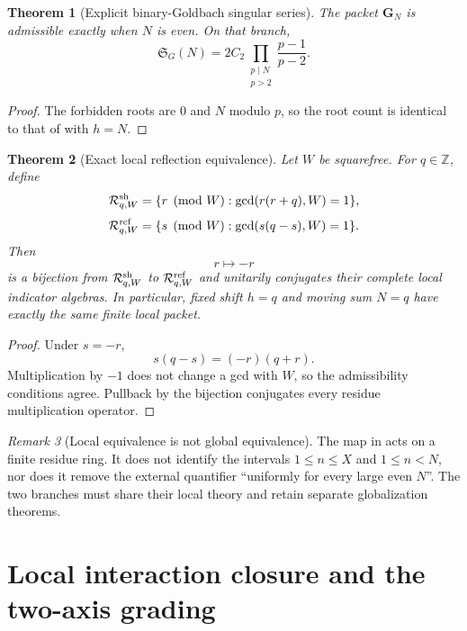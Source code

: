 \documentclass[11pt]{article}
\newtheorem{theorem}{Theorem}[section]
\theoremstyle{definition}
\theoremstyle{remark}
\newtheorem{remark}[theorem]{Remark}
\newcommand{\Z}{\mathbb Z}
\begin{document}
\begin{theorem}[Explicit binary-Goldbach singular series]
\label{thm:goldbach-series}
The packet $\bm G_N$ is admissible exactly when $N$ is even.  On that branch,
\[
 \boxed{
 \mathfrak S_G(N)
 =2C_2\prod_{\substack{p\mid N\\p>2}}
       \frac{p-1}{p-2}.}
 \tag{4.6}
\]
\end{theorem}

\begin{proof}
The forbidden roots are $0$ and $N$ modulo $p$, so the root count is identical
to that of  with $h=N$.
\end{proof}

\begin{theorem}[Exact local reflection equivalence]
\label{thm:local-reflection}
Let $W$ be squarefree.  For $q\in\Z$, define
\[
 \mathcal R_{q,W}^{\rm sh}
 =\{r\pmod W:\gcd(r(r+q),W)=1\},
\]
\[
 \mathcal R_{q,W}^{\rm ref}
 =\{s\pmod W:\gcd(s(q-s),W)=1\}.
\]
Then
\[
 \boxed{r\longmapsto-r}
 \tag{4.7}
\]
is a bijection from $\mathcal R_{q,W}^{\rm sh}$ to
$\mathcal R_{q,W}^{\rm ref}$ and unitarily conjugates their complete local
indicator algebras.  In particular, fixed shift $h=q$ and moving sum $N=q$
have exactly the same finite local packet.
\end{theorem}

\begin{proof}
Under $s=-r$,
\[
 s(q-s)=(-r)(q+r).
\]
Multiplication by $-1$ does not change a gcd with $W$, so the admissibility
conditions agree.  Pullback by the bijection conjugates every residue
multiplication operator.
\end{proof}

\begin{remark}[Local equivalence is not global equivalence]
The map in  acts on a finite residue ring.  It does
not identify the intervals $1\le n\le X$ and $1\le n<N$, nor does it remove the
external quantifier ``uniformly for every large even $N$''.  The two branches
must share their local theory and retain separate globalization theorems.
\end{remark}

\section{Local interaction closure and the two-axis grading}
\label{sec:local-closure}
\end{document}
